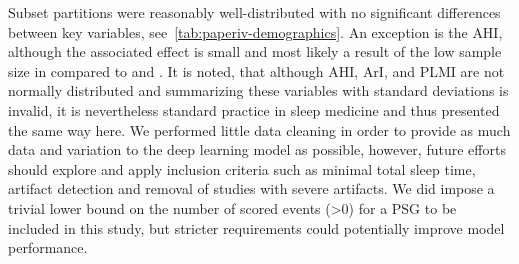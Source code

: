 Subset partitions were reasonably well-distributed with no significant differences between key variables, see~\cref{tab:paperiv-demographics}. 
An exception is the \ac{AHI}, although the associated effect is small and most likely a result of the low sample size in \eval compared to \train and \test. 
It is noted, that although \ac{AHI}, \ac{ArI}, and \ac{PLMI} are not normally distributed and summarizing these variables with standard deviations is invalid, it is nevertheless standard practice in sleep medicine and thus presented the same way here. 
We performed little data cleaning in order to provide as much data and variation to the deep learning model as possible, however, future efforts should explore and apply inclusion criteria such as minimal total sleep time, artifact detection and removal of studies with severe artifacts. 
We did impose a trivial lower bound on the number of scored events (\num{>0}) for a \ac{PSG} to be included in this study, but stricter requirements could potentially improve model performance.

